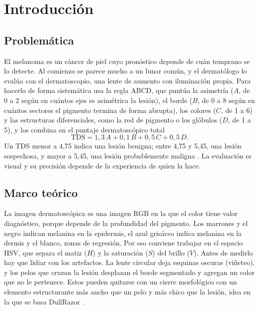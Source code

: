 \section{Introducción}
\label{sec:introduccion}

\subsection{Problemática}
\label{sec:problematica}

El melanoma es un cáncer de piel cuyo pronóstico depende de cuán temprano se lo detecte. Al comienzo se parece mucho a un lunar común, y el dermatólogo lo evalúa con el dermatoscopio, una lente de aumento con iluminación propia. Para hacerlo de forma sistemática usa la regla ABCD, que puntúa la asimetría ($A$, de 0 a 2 según en cuántos ejes es asimétrica la lesión), el borde ($B$, de 0 a 8 según en cuántos sectores el pigmento termina de forma abrupta), los colores ($C$, de 1 a 6) y las estructuras diferenciales, como la red de pigmento o los glóbulos ($D$, de 1 a 5), y los combina en el puntaje dermatoscópico total
\begin{equation}
  \mathrm{TDS} = 1{,}3\,A + 0{,}1\,B + 0{,}5\,C + 0{,}5\,D .
  \label{eq:tds}
\end{equation}
Un TDS menor a 4,75 indica una lesión benigna; entre 4,75 y 5,45, una lesión sospechosa, y mayor a 5,45, una lesión probablemente maligna \parencite{nachbar1994}. La evaluación es visual y su precisión depende de la experiencia de quien la hace.

\subsection{Marco teórico}
\label{sec:marco}

La imagen dermatoscópica es una imagen RGB en la que el color tiene valor diagnóstico, porque depende de la profundidad del pigmento. Los marrones y el negro indican melanina en la epidermis, el azul grisáceo indica melanina en la dermis y el blanco, zonas de regresión. Por eso conviene trabajar en el espacio HSV, que separa el matiz ($H$) y la saturación ($S$) del brillo ($V$). Antes de medirlo hay que lidiar con los artefactos. La lente circular deja esquinas oscuras (viñeteo), y los pelos que cruzan la lesión desplazan el borde segmentado y agregan un color que no le pertenece. Estos pueden quitarse con un cierre morfológico con un elemento estructurante más ancho que un pelo y más chico que la lesión, idea en la que se basa DullRazor \parencite{lee1997}.

